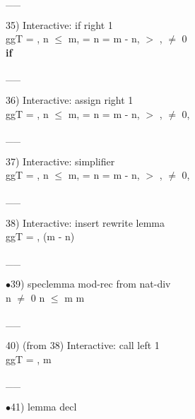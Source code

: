 \documentclass[a4paper]{article}
\begin{document}
\vspace{-1.5ex}\_\hrulefill \_

35) Interactive: if right  1\\
\tabf \Do ggT\Dc {} = , n $\le$ m,  = n \And {} = m - n, \Not {} $>$ ,  $\neq$ 0 \\
\Fol \Do 
{\bf if}  %

\vspace{-1.5ex}\_\hrulefill \_

36) Interactive: assign right  1\\
\Do ggT\Dc {} = , n $\le$ m,  = n \And {} = m - n, \Not {} $>$ ,  $\neq$ 0,  %

\vspace{-1.5ex}\_\hrulefill \_

37) Interactive: simplifier \\
\Do ggT\Dc {} = , n $\le$ m,  = n \And {} = m - n, \Not {} $>$ ,  $\neq$ 0,  %

\vspace{-1.5ex}\_\hrulefill \_

38) Interactive: insert rewrite lemma \\
\Do ggT\Dc {} = , (m - n) %

\vspace{-1.5ex}\_\hrulefill \_

$\bullet$39) speclemma mod-rec from nat-div \\
n $\neq$ 0 \Fol n $\le$ m \Imp m %

\vspace{-1.5ex}\_\hrulefill \_

40)  (from 38) Interactive: call left  1\\
\Do ggT\Dc {} = , m %

\vspace{-1.5ex}\_\hrulefill \_

$\bullet$41) lemma decl \\
 \Fol 
\end{document}
